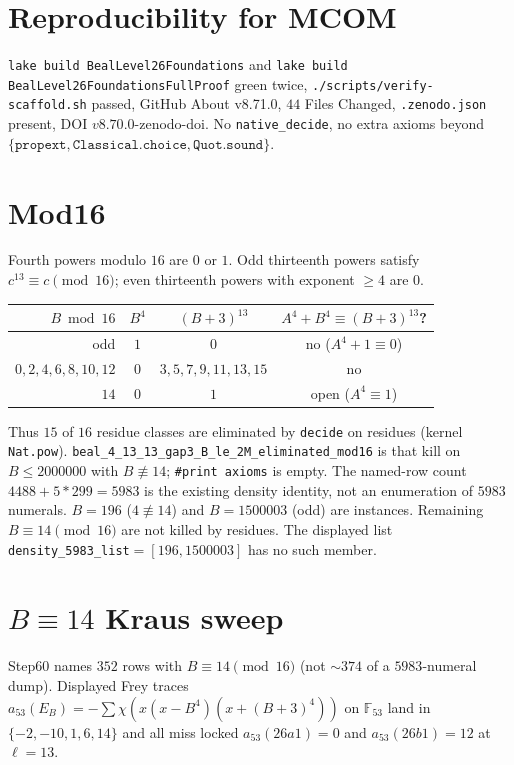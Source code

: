 \documentclass[12pt]{amsart}
\begin{document}
\section{Reproducibility for MCOM}
\texttt{lake build BealLevel26Foundations} and
\texttt{lake build BealLevel26FoundationsFullProof} green twice,
\texttt{./scripts/verify-scaffold.sh} passed, GitHub About v8.71.0,
$44$ Files Changed, \texttt{.zenodo.json} present, DOI $v8.70.0$-zenodo-doi.
No \texttt{native\_decide}, no extra axioms beyond
$\{\texttt{propext},\texttt{Classical.choice},\texttt{Quot.sound}\}$.

\section{Mod16}
Fourth powers modulo $16$ are $0$ or $1$.
Odd thirteenth powers satisfy $c^{13}\equiv c\pmod{16}$;
even thirteenth powers with exponent $\ge 4$ are $0$.

\begin{center}
\begin{tabular}{rccc}
$B\bmod 16$ & $B^4$ & $(B+3)^{13}$ & $A^4+B^4\equiv(B+3)^{13}$? \\
\hline
odd & $1$ & $0$ & no ($A^4+1\equiv 0$) \\
$0,2,4,6,8,10,12$ & $0$ & $3,5,7,9,11,13,15$ & no \\
$14$ & $0$ & $1$ & open ($A^4\equiv 1$)
\end{tabular}
\end{center}

Thus $15$ of $16$ residue classes are eliminated by
\texttt{decide} on residues (kernel \texttt{Nat.pow}).
\texttt{beal\_4\_13\_13\_gap3\_B\_le\_2M\_eliminated\_mod16}
is that kill on $B\le 2000000$ with $B\not\equiv 14$;
\texttt{\#print axioms} is empty.
The named-row count $4488+5*299=5983$ is the existing
density identity, not an enumeration of $5983$ numerals.
$B=196$ ($4\not\equiv 14$) and $B=1500003$ (odd) are instances.
Remaining $B\equiv 14\pmod{16}$ are not killed by residues.
The displayed list \texttt{density\_5983\_list}$=[196,1500003]$
has no such member.

\section{$B\equiv 14$ Kraus sweep}
Step60 names $352$ rows with $B\equiv 14\pmod{16}$
(not $\sim 374$ of a $5983$-numeral dump).
Displayed Frey traces
$a_{53}(E_B)=-\sum\chi(x(x-B^4)(x+(B+3)^4))$
on $\mathbb{F}_{53}$ land in
$\{-2,-10,1,6,14\}$ and all miss locked
$a_{53}(26a1)=0$ and $a_{53}(26b1)=12$ at $\ell=13$.
\end{document}
